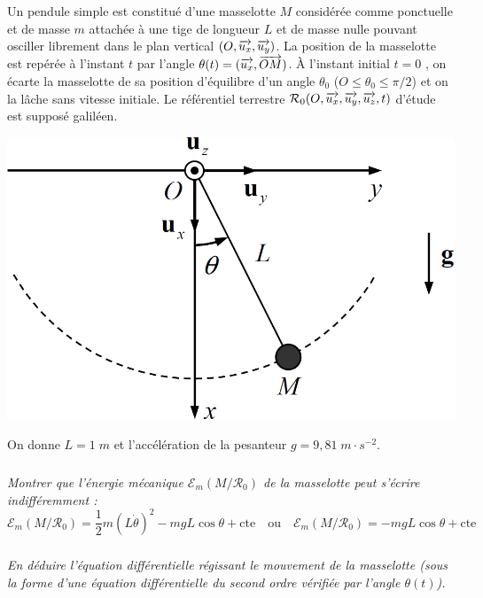 \documentclass[10pt,oneside]{article}
\begin{document}
\begin{minipage}[c]{.6\linewidth}
Un pendule simple est constitué d’une masselotte $M$ considérée comme ponctuelle et de masse $m$ attachée à une tige de longueur $L$ et de masse nulle pouvant osciller librement dans le plan vertical $(O ,\overrightarrow{u_x} ,\overrightarrow{u_y} )$. La position de la masselotte
est repérée à l’instant $t$ par l’angle $\theta(t) = (\overrightarrow{u_x} , \overrightarrow{OM})$. À l’instant initial $t = 0$ , on écarte la masselotte de sa position d'équilibre d'un angle  $\theta_0$  ($O\leq \theta_0\leq\pi/2$) et on la lâche sans vitesse initiale. Le
référentiel terrestre $\mathcal{R}_0(O,\overrightarrow{u_x},\overrightarrow{u_y},\overrightarrow{u_z},t)$ d’étude est supposé galiléen.
\end{minipage}\hfill
\begin{minipage}[c]{.35\linewidth}
\begin{center}
\includegraphics[width=.95\textwidth]{images/pendule}
\end{center}
\end{minipage}

On donne $L=1\;m$ et l'accélération de la pesanteur $g=9,81\; m\cdot s^{-2}$. 


\subparagraph{\label{q1}}
\textit{Montrer que l’énergie mécanique $\mathcal{E}_m(M/\mathcal{R}_0)$ de la masselotte peut s'écrire indifféremment :}
\begin{equation}
\label{eq1}
\mathcal{E}_m(M/\mathcal{R}_0) = \dfrac{1}{2}m\left( L\dot{\theta} \right)^2 -mgL\cos\theta + \text{cte} \quad \text{ou}\quad \mathcal{E}_m(M/\mathcal{R}_0) = -mgL\cos\theta + \text{cte}
\end{equation}

\subparagraph{}
\textit{En déduire l'équation différentielle régissant le mouvement de la masselotte (sous la forme d’une équation différentielle du second ordre vérifiée par l’angle $\theta(t)$).}
\end{document}
